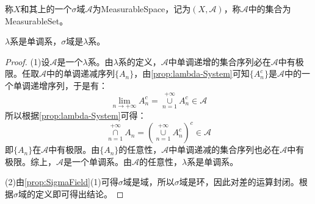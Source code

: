 \begin{definition}
	称$X$和其上的一个$\sigma$域$\mathscr{A}$为\gls{MeasurableSpace}，记为$(X,\mathscr{A})$，称$\mathscr{A}$中的集合为\gls{MeasurableSet}。
\end{definition}
\begin{theorem}\label{theo:SetNecessarilySet2}
	$\lambda$系是单调系，$\sigma$域是$\lambda$系。
\end{theorem}
\begin{proof}
	(1)设$\mathscr{A}$是一个$\lambda$系。由$\lambda$系的定义，$\mathscr{A}$中单调递增的集合序列必在$\mathscr{A}$中有极限。任取$\mathscr{A}$中的单调递减序列$\{A_n\}$，由\cref{prop:lambda-System}可知$\{A_n^c\}$是$\mathscr{A}$中的一个单调递增序列，于是有：
	\begin{equation*}
		\lim_{n\to+\infty}A_n^c=\underset{n=1}{\overset{+\infty}{\cup}}A_n^c\in\mathscr{A}
	\end{equation*}
	所以根据\cref{prop:lambda-System}可得：
	\begin{equation*}
		\underset{n=1}{\overset{+\infty}{\cap}}A_n=\left(\underset{n=1}{\overset{+\infty}{\cup}}A_n^c\right)^c\in\mathscr{A}
	\end{equation*}
	即$\{A_n\}$在$\mathscr{A}$中有极限。由$\{A_n\}$的任意性，$\mathscr{A}$中单调递减的集合序列也必在$\mathscr{A}$中有极限。综上，$\mathscr{A}$是一个单调系。由$\mathscr{A}$的任意性，$\lambda$系是单调系。\par
	(2)由\cref{prop:SigmaField}(1)可得$\sigma$域是域，所以$\sigma$域是环，因此对差的运算封闭。根据$\sigma$域的定义即可得出结论。
\end{proof}
